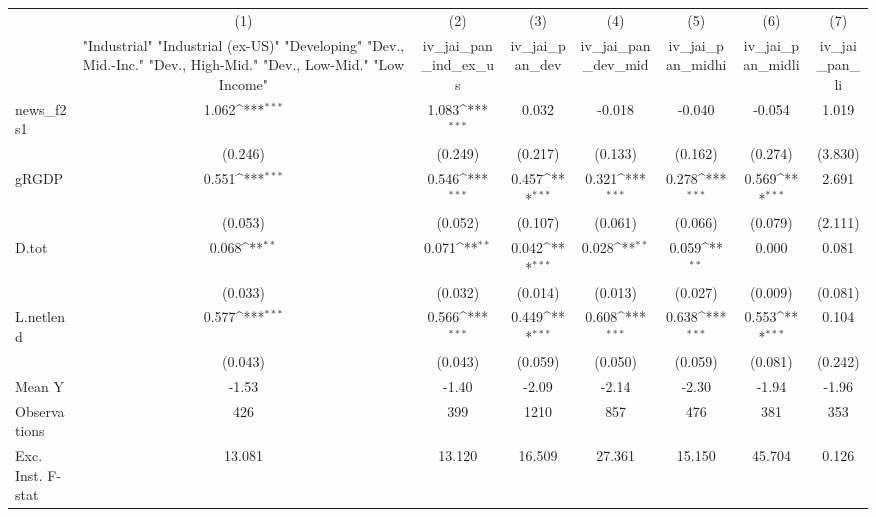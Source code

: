 {
\def\sym#1{\ifmmode^{#1}\else\(^{#1}\)\fi}
\begin{tabular}{l*{7}{c}}
\toprule
            &\multicolumn{1}{c}{(1)}&\multicolumn{1}{c}{(2)}&\multicolumn{1}{c}{(3)}&\multicolumn{1}{c}{(4)}&\multicolumn{1}{c}{(5)}&\multicolumn{1}{c}{(6)}&\multicolumn{1}{c}{(7)}\\
            &\multicolumn{1}{c}{ "Industrial" "Industrial (ex-US)" "Developing" "Dev., Mid.-Inc." "Dev., High-Mid."  "Dev., Low-Mid." "Low Income" }&\multicolumn{1}{c}{iv\_jai\_pan\_ind\_ex\_us}&\multicolumn{1}{c}{iv\_jai\_pan\_dev}&\multicolumn{1}{c}{iv\_jai\_pan\_dev\_mid}&\multicolumn{1}{c}{iv\_jai\_pan\_midhi}&\multicolumn{1}{c}{iv\_jai\_pan\_midli}&\multicolumn{1}{c}{iv\_jai\_pan\_li}\\
\midrule
news\_f2s1   &       1.062\sym{***}&       1.083\sym{***}&       0.032         &      -0.018         &      -0.040         &      -0.054         &       1.019         \\
            &     (0.246)         &     (0.249)         &     (0.217)         &     (0.133)         &     (0.162)         &     (0.274)         &     (3.830)         \\
\addlinespace
gRGDP       &       0.551\sym{***}&       0.546\sym{***}&       0.457\sym{***}&       0.321\sym{***}&       0.278\sym{***}&       0.569\sym{***}&       2.691         \\
            &     (0.053)         &     (0.052)         &     (0.107)         &     (0.061)         &     (0.066)         &     (0.079)         &     (2.111)         \\
\addlinespace
D.tot       &       0.068\sym{**} &       0.071\sym{**} &       0.042\sym{***}&       0.028\sym{**} &       0.059\sym{**} &       0.000         &       0.081         \\
            &     (0.033)         &     (0.032)         &     (0.014)         &     (0.013)         &     (0.027)         &     (0.009)         &     (0.081)         \\
\addlinespace
L.netlend   &       0.577\sym{***}&       0.566\sym{***}&       0.449\sym{***}&       0.608\sym{***}&       0.638\sym{***}&       0.553\sym{***}&       0.104         \\
            &     (0.043)         &     (0.043)         &     (0.059)         &     (0.050)         &     (0.059)         &     (0.081)         &     (0.242)         \\
\midrule
Mean Y      &       -1.53         &       -1.40         &       -2.09         &       -2.14         &       -2.30         &       -1.94         &       -1.96         \\
Observations&         426         &         399         &        1210         &         857         &         476         &         381         &         353         \\
Exc. Inst. F-stat&      13.081         &      13.120         &      16.509         &      27.361         &      15.150         &      45.704         &       0.126         \\
\bottomrule
\end{tabular}
}
